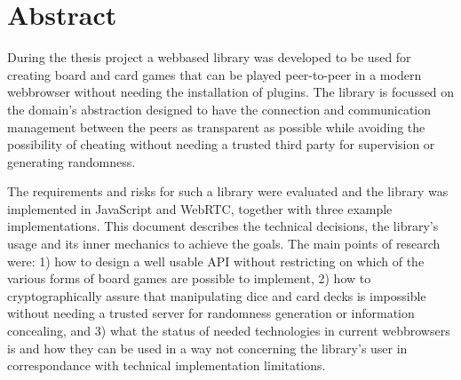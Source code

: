 
\chapter*{Abstract}

During the thesis project a webbased library was developed to be used for
creating board and card games that can be played peer-to-peer in a modern
webbrowser without needing the installation of plugins. The library is focussed
on the domain's abstraction designed to have the connection and communication
management between the peers as transparent as possible while avoiding the
possibility of cheating without needing a trusted third party for supervision or
generating randomness.

The requirements and risks for such a library were evaluated and the library was
implemented in JavaScript and WebRTC, together with three example
implementations. This document describes the technical decisions, the library's
usage and its inner mechanics to achieve the goals. The main points of research
were: 1) how to design a well usable API without restricting on which of the
various forms of board games are possible to implement, 2) how to
cryptographically assure that manipulating dice and card decks is impossible
without needing a trusted server for randomness generation or information
concealing, and 3) what the status of needed technologies in current webbrowsers
is and how they can be used in a way not concerning the library's user in
correspondance with technical implementation limitations.
